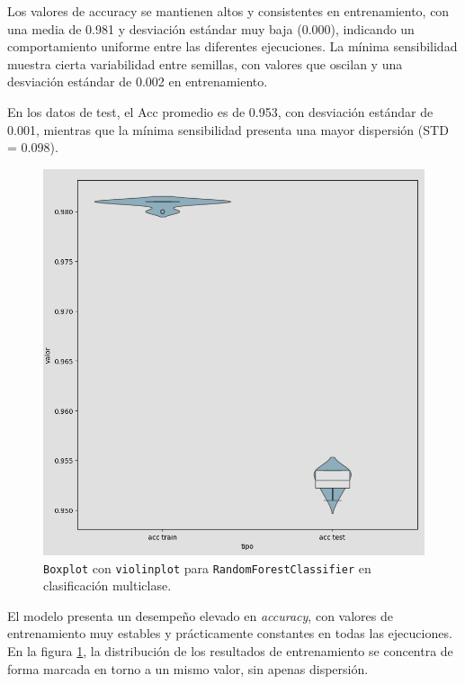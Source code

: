 Los valores de accuracy se mantienen altos y consistentes en entrenamiento, con una media de 0.981 y desviación estándar muy baja (0.000), indicando un comportamiento uniforme entre las diferentes ejecuciones. La mínima sensibilidad muestra cierta variabilidad entre semillas, con valores que oscilan y una desviación estándar de 0.002 en entrenamiento.

\vspace{1em}

En los datos de test, el Acc promedio es de 0.953, con desviación estándar de 0.001, mientras que la mínima sensibilidad presenta una mayor dispersión (STD = 0.098).

\begin{figure}[H]
	\centering
	\includegraphics[width=1\linewidth]{Imagenes/rf_multi}
	\caption[\texttt{Boxplot} con \texttt{violinplot} para \texttt{RandomForestClassifier} en clasificación multiclase]{\texttt{Boxplot} con \texttt{violinplot} para \texttt{RandomForestClassifier} en clasificación multiclase.}
	\label{fig:rf_multi}
\end{figure}

El modelo presenta un desempeño elevado en \textit{accuracy}, con valores de entrenamiento muy estables y prácticamente constantes en todas las ejecuciones. En la figura \ref{fig:rf_multi}, la distribución de los resultados de entrenamiento se concentra de forma marcada en torno a un mismo valor, sin apenas dispersión.


